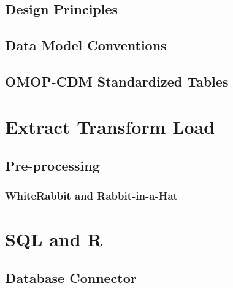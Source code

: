 \documentclass[]{book}
\begin{document}
\hypertarget{design-principles-1}{%
\section{Design Principles}\label{design-principles-1}}

\hypertarget{data-model-conventions-1}{%
\section{Data Model Conventions}\label{data-model-conventions-1}}

\hypertarget{omop-cdm-standardized-tables-1}{%
\section{OMOP-CDM Standardized Tables}\label{omop-cdm-standardized-tables-1}}

\hypertarget{etl}{%
\chapter{Extract Transform Load}\label{etl}}

\hypertarget{pre-processing}{%
\section{Pre-processing}\label{pre-processing}}

\hypertarget{whiterabbit-and-rabbit-in-a-hat}{%
\subsection{WhiteRabbit and Rabbit-in-a-Hat}\label{whiterabbit-and-rabbit-in-a-hat}}

\hypertarget{section-3}{%
\subsection{}\label{section-3}}

\hypertarget{sql-and-r}{%
\chapter{SQL and R}\label{sql-and-r}}

\hypertarget{database-connector}{%
\section{Database Connector}\label{database-connector}}
\end{document}
